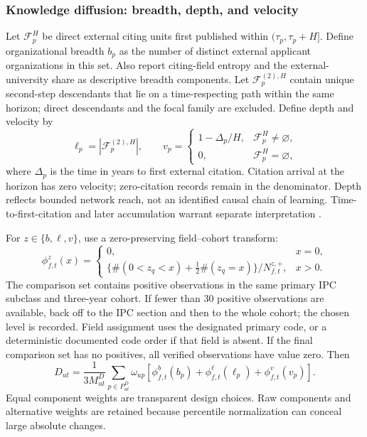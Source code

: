\subsubsection{Knowledge diffusion: breadth, depth, and velocity}
Let $\mathcal{F}_p^H$ be direct external citing units first published within
$(\tau_p,\tau_p+H]$. Define organizational breadth $b_p$ as the number of distinct
external applicant organizations in this set. Also report citing-field entropy
and the external-university share as descriptive breadth components. Let
$\mathcal{F}_p^{(2),H}$ contain unique second-step descendants that lie on a
time-respecting path within the same horizon; direct descendants and the focal
family are excluded. Define depth and velocity by
\begin{equation}
 \ell_p=|\mathcal{F}_p^{(2),H}|,\qquad
 v_p=\begin{cases}
 1-\Delta_p/H,&\mathcal{F}_p^H\ne\varnothing,\\
 0,&\mathcal{F}_p^H=\varnothing,
 \end{cases}
 \label{eq:diffusion-components}
\end{equation}
where $\Delta_p$ is the time in years to first external citation. Citation arrival
at the horizon has zero velocity; zero-citation records remain in the denominator.
Depth reflects bounded network reach, not an identified causal chain of learning.
Time-to-first-citation and later accumulation warrant separate interpretation
\citep{huang2019}.

For $z\in\{b,\ell,v\}$, use a zero-preserving field--cohort transform:
\begin{equation}
 \phi_{f,t}^{z}(x)=\begin{cases}
 0,&x=0,\\
 \{\#(0<z_q<x)+\tfrac12\#(z_q=x)\}/N_{f,t}^{z,+},&x>0.
 \end{cases}
 \label{eq:ranknorm}
\end{equation}
The comparison set contains positive observations in the same primary IPC
subclass and three-year cohort. If fewer than 30 positive observations are
available, back off to the IPC section and then to the whole cohort; the chosen
level is recorded. Field assignment uses the designated primary code, or a
deterministic documented code order if that field is absent. If the final
comparison set has no positives, all verified observations have value zero.
Then
\begin{equation}
 D_{ut}=\frac{1}{3M_{ut}^{D}}
 \sum_{p\in P_{ut}^{D}}\omega_{up}
 \left[\phi^{b}_{f,t}(b_p)+\phi^{\ell}_{f,t}(\ell_p)+\phi^{v}_{f,t}(v_p)\right].
 \label{eq:diffusion}
\end{equation}
Equal component weights are transparent design choices. Raw components and
alternative weights are retained because percentile normalization can conceal
large absolute changes.

